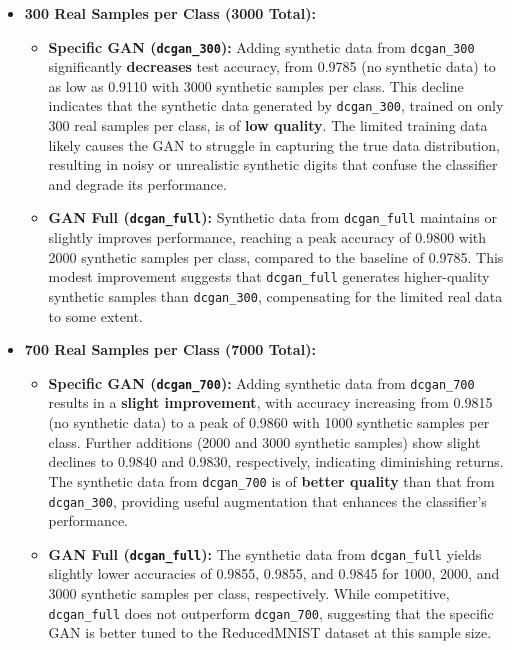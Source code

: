 \documentclass[12pt]{article}
\begin{document}
\begin{itemize}
    \item \textbf{300 Real Samples per Class (3000 Total):}
    \begin{itemize}
        \item \textbf{Specific GAN (\texttt{dcgan\_300}):} Adding synthetic data from \texttt{dcgan\_300} significantly \textbf{decreases} test accuracy, from 0.9785 (no synthetic data) to as low as 0.9110 with 3000 synthetic samples per class. This decline indicates that the synthetic data generated by \texttt{dcgan\_300}, trained on only 300 real samples per class, is of \textbf{low quality}. The limited training data likely causes the GAN to struggle in capturing the true data distribution, resulting in noisy or unrealistic synthetic digits that confuse the classifier and degrade its performance.
        \item \textbf{GAN Full (\texttt{dcgan\_full}):} Synthetic data from \texttt{dcgan\_full} maintains or slightly improves performance, reaching a peak accuracy of 0.9800 with 2000 synthetic samples per class, compared to the baseline of 0.9785. This modest improvement suggests that \texttt{dcgan\_full} generates higher-quality synthetic samples than \texttt{dcgan\_300}, compensating for the limited real data to some extent.
    \end{itemize}
    
    \item \textbf{700 Real Samples per Class (7000 Total):}
    \begin{itemize}
        \item \textbf{Specific GAN (\texttt{dcgan\_700}):} Adding synthetic data from \texttt{dcgan\_700} results in a \textbf{slight improvement}, with accuracy increasing from 0.9815 (no synthetic data) to a peak of 0.9860 with 1000 synthetic samples per class. Further additions (2000 and 3000 synthetic samples) show slight declines to 0.9840 and 0.9830, respectively, indicating diminishing returns. The synthetic data from \texttt{dcgan\_700} is of \textbf{better quality} than that from \texttt{dcgan\_300}, providing useful augmentation that enhances the classifier’s performance.
        \item \textbf{GAN Full (\texttt{dcgan\_full}):} The synthetic data from \texttt{dcgan\_full} yields slightly lower accuracies of 0.9855, 0.9855, and 0.9845 for 1000, 2000, and 3000 synthetic samples per class, respectively. While competitive, \texttt{dcgan\_full} does not outperform \texttt{dcgan\_700}, suggesting that the specific GAN is better tuned to the ReducedMNIST dataset at this sample size.
    \end{itemize}
    

\end{itemize}
\end{document}
